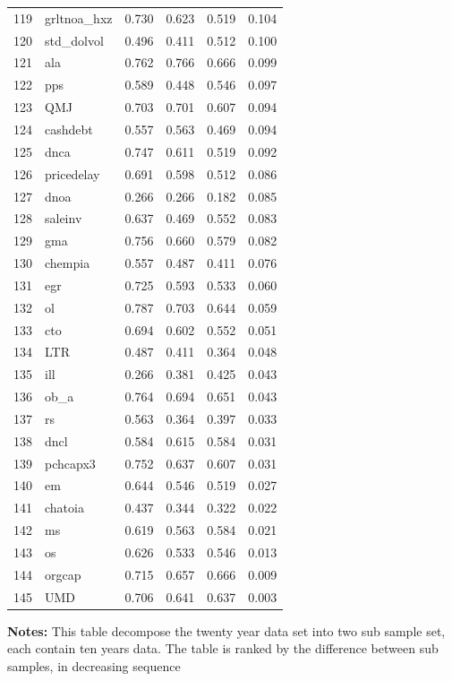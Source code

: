 \documentclass[12pt]{article}
\begin{document}
\begin{footnotesize}
\begin{longtable}{rl|c|c|c|c}
		119 & grltnoa\_hxz & 0.730 & 0.623 & 0.519 & 0.104 \\ 
		120 & std\_dolvol & 0.496 & 0.411 & 0.512 & 0.100 \\ 
		121 & ala & 0.762 & 0.766 & 0.666 & 0.099 \\ 
		122 & pps & 0.589 & 0.448 & 0.546 & 0.097 \\ 
		123 & QMJ & 0.703 & 0.701 & 0.607 & 0.094 \\ 
		124 & cashdebt & 0.557 & 0.563 & 0.469 & 0.094 \\ 
		125 & dnca & 0.747 & 0.611 & 0.519 & 0.092 \\ 
		126 & pricedelay & 0.691 & 0.598 & 0.512 & 0.086 \\ 
		127 & dnoa & 0.266 & 0.266 & 0.182 & 0.085 \\ 
		128 & saleinv & 0.637 & 0.469 & 0.552 & 0.083 \\ 
		129 & gma & 0.756 & 0.660 & 0.579 & 0.082 \\ 
		130 & chempia & 0.557 & 0.487 & 0.411 & 0.076 \\ 
		131 & egr & 0.725 & 0.593 & 0.533 & 0.060 \\ 
		132 & ol & 0.787 & 0.703 & 0.644 & 0.059 \\ 
		133 & cto & 0.694 & 0.602 & 0.552 & 0.051 \\ 
		134 & LTR & 0.487 & 0.411 & 0.364 & 0.048 \\ 
		135 & ill & 0.266 & 0.381 & 0.425 & 0.043 \\ 
		136 & ob\_a & 0.764 & 0.694 & 0.651 & 0.043 \\ 
		137 & rs & 0.563 & 0.364 & 0.397 & 0.033 \\ 
		138 & dncl & 0.584 & 0.615 & 0.584 & 0.031 \\ 
		139 & pchcapx3 & 0.752 & 0.637 & 0.607 & 0.031 \\ 
		140 & em & 0.644 & 0.546 & 0.519 & 0.027 \\ 
		141 & chatoia & 0.437 & 0.344 & 0.322 & 0.022 \\ 
		142 & ms & 0.619 & 0.563 & 0.584 & 0.021 \\ 
		143 & os & 0.626 & 0.533 & 0.546 & 0.013 \\ 
		144 & orgcap & 0.715 & 0.657 & 0.666 & 0.009 \\ 
		145 & UMD & 0.706 & 0.641 & 0.637 & 0.003 \\ 
		\hline

	\end{longtable}
				\begin{minipage}{\textwidth}
		{\footnotesize {\bf Notes:} This table decompose the twenty year data set into two sub sample set, each contain ten years data. The table is ranked by the difference between  sub samples, in decreasing sequence}
	\end{minipage}
	
	
\end{footnotesize}
\end{document}
